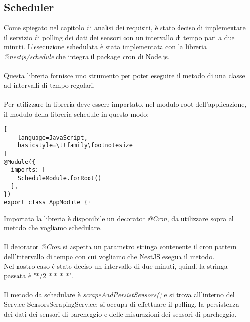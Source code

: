 \subsection{Scheduler}
Come spiegato nel capitolo di analisi dei requisiti, è  stato deciso di implementare il servizio di polling dei dati
dei sensori con un intervallo di tempo pari a due minuti. L'esecuzione schedulata è stata implementata con
la libreria \textit{@nestjs/schedule} che integra il package cron di Node.js.
\\\\
Questa libreria fornisce uno strumento per poter eseguire il metodo
di una classe ad intervalli di tempo regolari.
\\\\
Per utilizzare la libreria deve essere importato, nel modulo root dell'applicazione, il modulo della libreria schedule in questo modo:
\begin{lstlisting}[
    language=JavaScript,
    basicstyle=\ttfamily\footnotesize
]
@Module({
  imports: [
    ScheduleModule.forRoot()
  ],
})
export class AppModule {}
\end{lstlisting}
\leavevmode\newline
Importata la libreria è disponibile un decorator \textit{@Cron}, da utilizzare sopra al metodo che vogliamo schedulare. 
\\\\
Il decorator \textit{@Cron} si aspetta un parametro stringa contenente il cron pattern
dell'intervallo di tempo con cui vogliamo che NestJS esegua il metodo.
\\
Nel nostro caso è stato deciso un intervallo di due minuti, quindi la stringa passata è "*/2 * * * *".
\\\\
Il metodo da schedulare è \textit{scrapeAndPersistSensors()} e si trova all'interno del Service SensorsScrapingService; si occupa
di effettuare il polling, la persistenza dei dati dei sensori di parcheggio e delle misurazioni dei sensori di parcheggio.

